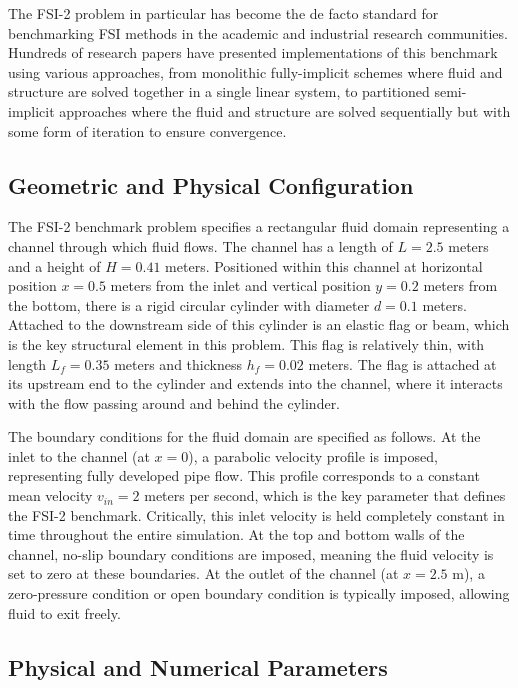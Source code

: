 ﻿\documentclass[a4paper,11pt]{article}
\theoremstyle{definition}
\begin{document}
The FSI-2 problem in particular has become the de facto standard for benchmarking FSI methods in the academic and industrial research communities. Hundreds of research papers have presented implementations of this benchmark using various approaches, from monolithic fully-implicit schemes where fluid and structure are solved together in a single linear system, to partitioned semi-implicit approaches where the fluid and structure are solved sequentially but with some form of iteration to ensure convergence.

\subsection{Geometric and Physical Configuration}

The FSI-2 benchmark problem specifies a rectangular fluid domain representing a channel through which fluid flows. The channel has a length of $L = 2.5$ meters and a height of $H = 0.41$ meters. Positioned within this channel at horizontal position $x = 0.5$ meters from the inlet and vertical position $y = 0.2$ meters from the bottom, there is a rigid circular cylinder with diameter $d = 0.1$ meters. Attached to the downstream side of this cylinder is an elastic flag or beam, which is the key structural element in this problem. This flag is relatively thin, with length $L_f = 0.35$ meters and thickness $h_f = 0.02$ meters. The flag is attached at its upstream end to the cylinder and extends into the channel, where it interacts with the flow passing around and behind the cylinder.

The boundary conditions for the fluid domain are specified as follows. At the inlet to the channel (at $x = 0$), a parabolic velocity profile is imposed, representing fully developed pipe flow. This profile corresponds to a constant mean velocity $v_{in} = 2$ meters per second, which is the key parameter that defines the FSI-2 benchmark. Critically, this inlet velocity is held completely constant in time throughout the entire simulation. At the top and bottom walls of the channel, no-slip boundary conditions are imposed, meaning the fluid velocity is set to zero at these boundaries. At the outlet of the channel (at $x = 2.5$ m), a zero-pressure condition or open boundary condition is typically imposed, allowing fluid to exit freely.

\subsection{Physical and Numerical Parameters}
\end{document}

